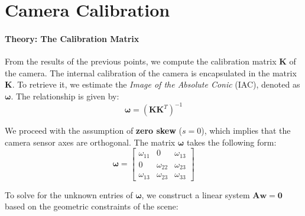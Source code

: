 \documentclass[a4paper,11pt]{article}
\newcommand{\matr}[1]{\bm{#1}}     %
\newcommand{\vect}[1]{\mathbf{#1}}  %
\begin{document}
\section{Camera Calibration}

\paragraph{Theory: The Calibration Matrix}
From the results of the previous points, we compute the calibration matrix $\mathbf{K}$ of the camera. The internal calibration of the camera is encapsulated in the matrix $\matr{K}$. To retrieve it, we estimate the \textit{Image of the Absolute Conic} (IAC), denoted as $\matr{\omega}$. The relationship is given by:
\begin{equation}
    \matr{\omega} = (\matr{K}\matr{K}^T)^{-1}
\end{equation}

We proceed with the assumption of \textbf{zero skew} ($s=0$), which implies that the camera sensor axes are orthogonal. The matrix $\matr{\omega}$ takes the following form:
\begin{equation}
    \matr{\omega} = 
    \begin{bmatrix}
    \omega_{11} & 0 & \omega_{13} \\
    0 & \omega_{22} & \omega_{23} \\
    \omega_{13} & \omega_{23} & \omega_{33}
    \end{bmatrix}
\end{equation}

To solve for the unknown entries of $\matr{\omega}$, we construct a linear system $\matr{A}\vect{w} = \vect{0}$ based on the geometric constraints of the scene:
\end{document}
